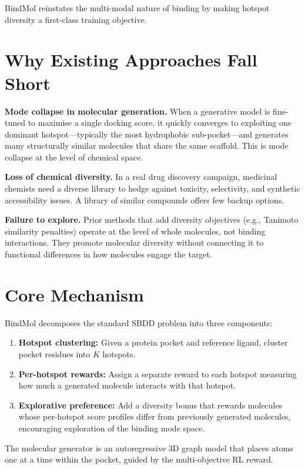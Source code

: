 \documentclass[10pt,twocolumn]{article}
\begin{document}
BindMol reinstates the multi-modal nature of binding by making hotspot diversity a first-class training objective.

\section{Why Existing Approaches Fall Short}

\textbf{Mode collapse in molecular generation.}
When a generative model is fine-tuned to maximise a single docking score, it quickly converges to exploiting one dominant hotspot---typically the most hydrophobic sub-pocket---and generates many structurally similar molecules that share the same scaffold.
This is mode collapse at the level of chemical space.

\textbf{Loss of chemical diversity.}
In a real drug discovery campaign, medicinal chemists need a diverse library to hedge against toxicity, selectivity, and synthetic accessibility issues.
A library of similar compounds offers few backup options.

\textbf{Failure to explore.}
Prior methods that add diversity objectives (e.g., Tanimoto similarity penalties) operate at the level of whole molecules, not binding interactions.
They promote molecular diversity without connecting it to functional differences in how molecules engage the target.

\section{Core Mechanism}

BindMol decomposes the standard SBDD problem into three components:

\begin{enumerate}[leftmargin=1.5em,itemsep=2pt]
  \item \textbf{Hotspot clustering:} Given a protein pocket and reference ligand, cluster pocket residues into $K$ hotspots.
  \item \textbf{Per-hotspot rewards:} Assign a separate reward to each hotspot measuring how much a generated molecule interacts with that hotspot.
  \item \textbf{Explorative preference:} Add a diversity bonus that rewards molecules whose per-hotspot score profiles differ from previously generated molecules, encouraging exploration of the binding mode space.
\end{enumerate}

The molecular generator is an autoregressive 3D graph model that places atoms one at a time within the pocket, guided by the multi-objective RL reward.
\end{document}
